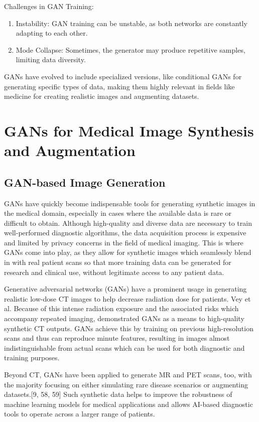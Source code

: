 \documentclass[12pt]{article}
\begin{document}
Challenges in GAN Training:
\begin{enumerate}

\item Instability: GAN training can be unstable, as both networks are constantly adapting to each other.
\item Mode Collapse: Sometimes, the generator may produce repetitive samples, limiting data diversity.

\end{enumerate}

GANs have evolved to include specialized versions, like conditional GANs for generating specific types of data, making them highly relevant in fields like medicine for creating realistic images and augmenting datasets.

\section{GANs for Medical Image Synthesis and Augmentation}
\subsection{GAN-based Image Generation}
GANs have quickly become indispensable tools for generating synthetic images in the medical domain, especially in cases where the available data is rare or difficult to obtain. Although high-quality and diverse data are necessary to train well-performed diagnostic algorithms, the data acquisition process is expensive and limited by privacy concerns in the field of medical imaging. This is where GANs come into play, as they allow for synthetic images which seamlessly blend in with real patient scans so that more training data can be generated for research and clinical use, without legitimate access to any patient data.

Generative adversarial networks (GANs) have a prominent usage in generating realistic low-dose CT images to help decrease radiation dose for patients. Vey et al. Because of this intense radiation exposure and the associated risks which accompany repeated imaging, \cite{Vey2019} demonstrated GANs as a means to high-quality synthetic CT outputs. GANs achieve this by training on previous high-resolution scans and thus can reproduce minute features, resulting in images almost indistinguishable from actual scans which can be used for both diagnostic and training purposes.

Beyond CT, GANs have been applied to generate MR and PET scans, too, with the majority focusing on either simulating rare disease scenarios or augmenting datasets.[9, 58, 59] Such synthetic data helps to improve the robustness of machine learning models for medical applications and allows AI-based diagnostic tools to operate across a larger range of patients.
\end{document}
